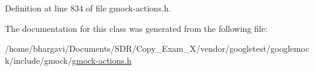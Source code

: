 Definition at line 834 of file gmock-\/actions.\+h.



The documentation for this class was generated from the following file\+:\begin{DoxyCompactItemize}
\item 
/home/bhargavi/\+Documents/\+S\+D\+R/\+Copy\+\_\+\+Exam\+\_\+X/vendor/googletest/googlemock/include/gmock/\hyperlink{gmock-actions_8h}{gmock-\/actions.\+h}\end{DoxyCompactItemize}
